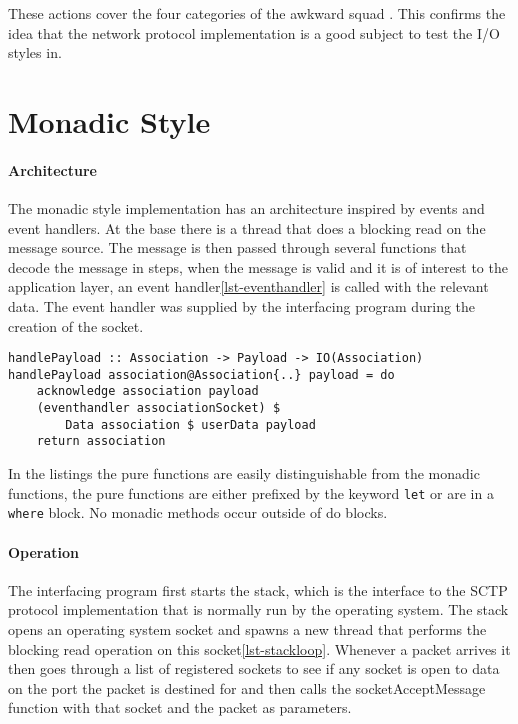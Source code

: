 These actions cover the four categories of the awkward squad \cite{jones_tackling_2009}. 
This confirms the idea that the network protocol implementation is a good subject to test the I/O styles in.
\section{Monadic Style}
\paragraph{Architecture}
The monadic style implementation has an architecture inspired by events and event handlers. At the base there is a thread that does a blocking read on the message source. The message is then passed through several functions that decode the message in steps, when the message is valid and it is of interest to the application layer, an event handler\ref{lst-eventhandler} is called with the relevant data. The event handler was supplied by the interfacing program during the creation of the socket.

\begin{lstlisting}[caption={The eventhandler is called when a payload is received},label={lst-eventhandler}]
handlePayload :: Association -> Payload -> IO(Association)
handlePayload association@Association{..} payload = do 
    acknowledge association payload
    (eventhandler associationSocket) $
	    Data association $ userData payload
    return association
\end{lstlisting}

In the listings the pure functions are easily distinguishable from the monadic functions, the pure functions are either prefixed by the keyword \lstinline{let} or are in a \lstinline{where} block. No monadic methods occur outside of do blocks.

\paragraph{Operation}
The interfacing program first starts the stack, which is the interface to the SCTP protocol implementation that is normally run by the operating system. The stack opens an operating system socket and spawns a new thread that performs the blocking read operation on this socket\ref{lst-stackloop}. Whenever a packet arrives it then goes through a list of registered sockets to see if any socket is open to data on the port the packet is destined for and then calls the socketAcceptMessage function with that socket and the packet as parameters.

